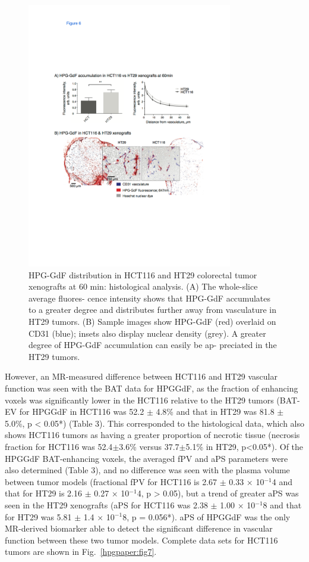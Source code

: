 \begin{figure}[htbp]   
 \begin{center}  
 \includegraphics[width=0.8\textwidth]{hpg/hpg-images/hpg_fig6-accumulation.pdf}
 \caption{HPG-GdF distribution in HCT116 and HT29 colorectal tumor xenografts at 60 min: histological analysis. (A) The whole-slice average fluores- cence intensity shows that HPG-GdF accumulates to a greater degree and distributes further away from vasculature in HT29 tumors. (B) Sample images show HPG-GdF (red) overlaid on CD31 (blue); insets also display nuclear density (grey). A greater degree of HPG-GdF accumulation can easily be ap- preciated in the HT29 tumors.}  
 \label{hpgpaper:fig6}  
 \end{center}
\end{figure}

However, an MR-measured difference between HCT116 and HT29 vascular function was seen with the BAT data for HPGGdF, as the fraction of enhancing voxels was significantly lower in the HCT116 relative to the HT29 tumors (BAT-EV for HPGGdF in HCT116 was 52.2 $\pm$ 4.8\% and that in HT29 was 81.8 $\pm$ 5.0\%, p < 0.05*) (Table 3).
This corresponded to the histological data, which also shows HCT116 tumors as having a greater proportion of necrotic tissue (necrosis fraction for HCT116 was 52.4$\pm$3.6\% versus 37.7$\pm$5.1\% in HT29, p<0.05*).
Of the HPGGdF BAT-enhancing voxels, the averaged fPV and aPS parameters were also determined (Table 3), and no difference was seen with the plasma volume between tumor models (fractional fPV for HCT116 is 2.67 $\pm$ 0.33 × 10$^{-1}$4 and that for HT29 is 2.16 $\pm$ 0.27 × 10$^{-1}$4, p > 0.05), but a trend of greater aPS was seen in the HT29 xenografts (aPS for HCT116 was 2.38 $\pm$ 1.00 × 10$^{-1}$8 and that for HT29 was 5.81 $\pm$ 1.4 × 10$^{-1}$8, p = 0.056*).
aPS of HPGGdF was the only MR-derived biomarker able to detect the significant difference in vascular function between these two tumor models.
Complete data sets for HCT116 tumors are shown in Fig.~\ref{hpgpaper:fig7}.

